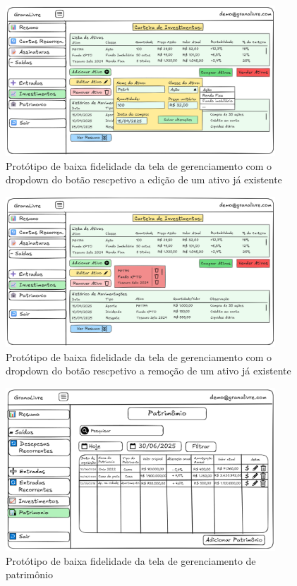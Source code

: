 \begin{figure}[H]
    \centering
    \includegraphics[width=0.9\textwidth]{imgs/08-investimentos_4.png}
    \caption{Protótipo de baixa fidelidade da tela de gerenciamento com o dropdown do botão rescpetivo a edição de um ativo já existente}
    \label{fig:prot_investimentos5}
\end{figure}

\begin{figure}[H]
    \centering
    \includegraphics[width=0.9\textwidth]{imgs/08-investimentos_5.png}
    \caption{Protótipo de baixa fidelidade da tela de gerenciamento com o dropdown do botão rescpetivo a remoção de um ativo já existente}
    \label{fig:prot_investimentos6}
\end{figure}

\begin{figure}[H]
    \centering
    \includegraphics[width=0.9\textwidth]{imgs/09-patrimonio.png}
    \caption{Protótipo de baixa fidelidade da tela de gerenciamento de patrimônio}
    \label{fig:prot_patrimonio}
\end{figure}

